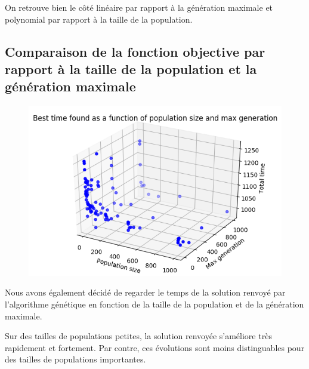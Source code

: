 On retrouve bien le côté linéaire par rapport à la génération maximale et polynomial par rapport à la taille de la population.

\newpage

\subsection{Comparaison de la fonction objective par rapport à la taille de la population et la génération maximale}

\begin{figure}[!h]
    \centering
    \includegraphics[scale=0.9]{report/Pictures/setb4c9_benchmarks_generation_with_solution_time.png}
\end{figure}

Nous avons également décidé de regarder le temps de la solution renvoyé par l'algorithme génétique en fonction de la taille de la population et de la génération maximale.

Sur des tailles de populations petites, la solution renvoyée s'améliore très rapidement et fortement. Par contre, ces évolutions sont moins distinguables pour des tailles de populations importantes.

\newpage